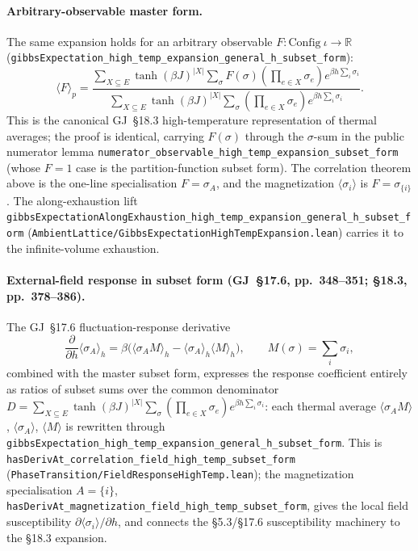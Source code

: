 \documentclass[a4paper,11pt]{article}
\begin{document}
\paragraph{Arbitrary-observable master form.} The same expansion holds for an
arbitrary observable \(F : \mathrm{Config}~\iota \to \mathbb{R}\)
(\texttt{gibbsExpectation\_high\_temp\_expansion\_general\_h\_subset\_form}):
\[
\langle F \rangle_p =
  \frac{\sum_{X \subseteq E} \tanh(\beta J)^{|X|}
        \sum_\sigma F(\sigma) (\prod_{e \in X} \sigma_e) e^{\beta h \sum_i \sigma_i}}
       {\sum_{X \subseteq E} \tanh(\beta J)^{|X|}
        \sum_\sigma (\prod_{e \in X} \sigma_e) e^{\beta h \sum_i \sigma_i}}.
\]
This is the canonical GJ~\S18.3 high-temperature representation of thermal
averages; the proof is identical, carrying \(F(\sigma)\) through the
\(\sigma\)-sum in the public numerator lemma
\texttt{numerator\_observable\_high\_temp\_expansion\_subset\_form} (whose
\(F = 1\) case is the partition-function subset form). The correlation theorem
above is the one-line specialisation \(F = \sigma_A\), and the magnetization
\(\langle\sigma_i\rangle\) is \(F = \sigma_{\{i\}}\). The along-exhaustion lift
\texttt{gibbsExpectationAlongExhaustion\_high\_temp\_expansion\_general\_h\_subset\_form}
(\texttt{AmbientLattice/GibbsExpectationHighTempExpansion.lean}) carries it to
the infinite-volume exhaustion.

\paragraph{External-field response in subset form (GJ~\S17.6, pp.~348--351;
\S18.3, pp.~378--386).}
The GJ~\S17.6 fluctuation-response derivative
\[
\frac{\partial}{\partial h}\langle\sigma_A\rangle_h
  = \beta\bigl(\langle\sigma_A M\rangle_h - \langle\sigma_A\rangle_h\langle M\rangle_h\bigr),
  \qquad M(\sigma) = \textstyle\sum_i \sigma_i,
\]
combined with the master subset form, expresses the response coefficient
entirely as ratios of subset sums over the common denominator
\(D = \sum_{X\subseteq E}\tanh(\beta J)^{|X|}\sum_\sigma(\prod_{e\in X}\sigma_e)e^{\beta h\sum_i\sigma_i}\):
each thermal average \(\langle\sigma_A M\rangle\), \(\langle\sigma_A\rangle\),
\(\langle M\rangle\) is rewritten through
\texttt{gibbsExpectation\_high\_temp\_expansion\_general\_h\_subset\_form}.
This is \texttt{hasDerivAt\_correlation\_field\_high\_temp\_subset\_form}
(\texttt{PhaseTransition/FieldResponseHighTemp.lean}); the magnetization
specialisation \(A=\{i\}\),
\texttt{hasDerivAt\_magnetization\_field\_high\_temp\_subset\_form}, gives the
local field susceptibility \(\partial\langle\sigma_i\rangle/\partial h\), and
connects the \S5.3/\S17.6 susceptibility machinery to the \S18.3 expansion.
\end{document}
